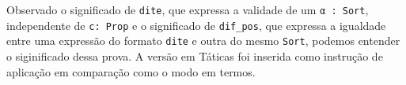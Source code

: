 Observado o significado de \lstinline{dite}, que expressa a validade de um
\lstinline{α : Sort}, independente de \lstinline{c: Prop} e o significado de
\lstinline{dif_pos}, que expressa a igualdade entre uma expressão do formato
\lstinline{dite} e outra do mesmo \lstinline{Sort}, podemos entender o
siginificado dessa prova. A versão em Táticas foi inserida como instrução de
aplicação em comparação como o modo em termos. 